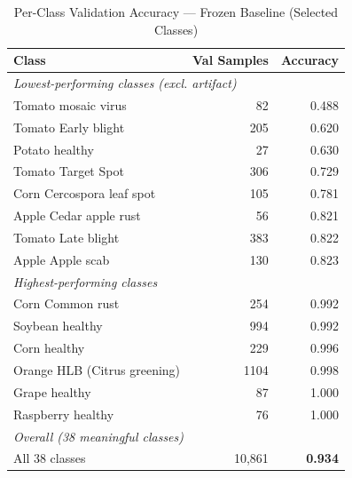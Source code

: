 \documentclass[conference]{IEEEtran}
\begin{document}
\begin{table}[t]
\caption{Per-Class Validation Accuracy --- Frozen Baseline (Selected Classes)}
\label{tab:perclass}
\centering
\renewcommand{\arraystretch}{1.2}
\begin{tabular}{@{}lrr@{}}
\toprule
\textbf{Class} & \textbf{Val Samples} & \textbf{Accuracy} \\
\midrule
\multicolumn{3}{l}{\textit{Lowest-performing classes (excl. artifact)}} \\
Tomato mosaic virus              & 82  & 0.488 \\
Tomato Early blight              & 205 & 0.620 \\
Potato healthy                   & 27  & 0.630 \\
Tomato Target Spot               & 306 & 0.729 \\
Corn Cercospora leaf spot        & 105 & 0.781 \\
Apple Cedar apple rust           & 56  & 0.821 \\
Tomato Late blight               & 383 & 0.822 \\
Apple Apple scab                 & 130 & 0.823 \\
\midrule
\multicolumn{3}{l}{\textit{Highest-performing classes}} \\
Corn Common rust                 & 254 & 0.992 \\
Soybean healthy                  & 994 & 0.992 \\
Corn healthy                     & 229 & 0.996 \\
Orange HLB (Citrus greening)     & 1104& 0.998 \\
Grape healthy                    & 87  & 1.000 \\
Raspberry healthy                & 76  & 1.000 \\
\midrule
\multicolumn{3}{l}{\textit{Overall (38 meaningful classes)}} \\
All 38 classes                   & 10,861 & \textbf{0.934} \\
\bottomrule
\end{tabular}
\end{table}
\end{document}
